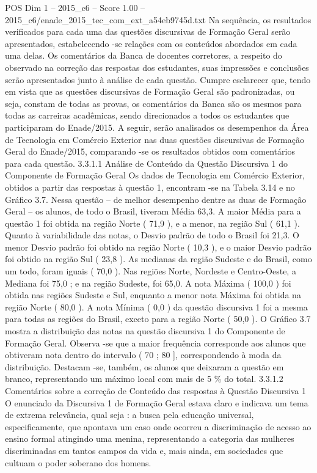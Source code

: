 \begin{textsample}{POS Dim 1 – 2015\_c6 – Score 1.00 – 2015\_c6/enade\_2015\_tec\_com\_ext\_a54eb9745d.txt}
Na sequência, os resultados verificados para cada uma das questões discursivas de Formação Geral serão apresentados, estabelecendo -se relações com os conteúdos abordados em cada uma delas.
Os comentários da Banca de docentes corretores, a respeito do observado na correção das respostas dos estudantes, suas impressões e conclusões serão apresentados junto à análise de cada questão.
Cumpre esclarecer que, tendo em vista que as questões discursivas de Formação Geral são padronizadas, ou seja, constam de todas as provas, os comentários da Banca são os mesmos para todas as carreiras acadêmicas, sendo direcionados a todos os estudantes que participaram do Enade/2015.
A seguir, serão analisados os desempenhos da Área de Tecnologia em Comércio Exterior nas duas questões discursivas de Formação Geral do Enade/2015, comparando -se os resultados obtidos com comentários para cada questão. 3.3.1.1 Análise de Conteúdo da Questão Discursiva 1 do Componente de Formação Geral Os dados de Tecnologia em Comércio Exterior, obtidos a partir das respostas à questão 1, encontram -se na Tabela 3.14 e no Gráfico 3.7.
Nessa questão – de melhor desempenho dentre as duas de Formação Geral – os alunos, de todo o Brasil, tiveram Média 63,3.
A maior Média para a questão 1 foi obtida na região Norte ( 71,9 ), e a menor, na região Sul ( 61,1 ).
Quanto à variabilidade das notas, o Desvio padrão de todo o Brasil foi 21,3.
O menor Desvio padrão foi obtido na região Norte ( 10,3 ), e o maior Desvio padrão foi obtido na região Sul ( 23,8 ).
As medianas da região Sudeste e do Brasil, como um todo, foram iguais ( 70,0 ).
Nas regiões Norte, Nordeste e Centro-Oeste, a Mediana foi 75,0 ; e na região Sudeste, foi 65,0.
A nota Máxima ( 100,0 ) foi obtida nas regiões Sudeste e Sul, enquanto a menor nota Máxima foi obtida na região Norte ( 80,0 ).
A nota Mínima ( 0,0 ) da questão discursiva 1 foi a mesma para todas as regiões do Brasil, exceto para a região Norte ( 50,0 ).
O Gráfico 3.7 mostra a distribuição das notas na questão discursiva 1 do Componente de Formação Geral.
Observa -se que a maior frequência corresponde aos alunos que obtiveram nota dentro do intervalo ( 70 ; 80 ], correspondendo à moda da distribuição.
Destacam -se, também, os alunos que deixaram a questão em branco, representando um máximo local com mais de 5 \% do total. 3.3.1.2 Comentários sobre a correção de Conteúdo das respostas à Questão Discursiva 1 O enunciado da Discursiva 1 de Formação Geral estava claro e indicava um tema de extrema relevância, qual seja : a busca pela educação universal, especificamente, que apontava um caso onde ocorreu a discriminação de acesso ao ensino formal atingindo uma menina, representando a categoria das mulheres discriminadas em tantos campos da vida e, mais ainda, em sociedades que cultuam o poder soberano dos homens.

\end{textsample}
